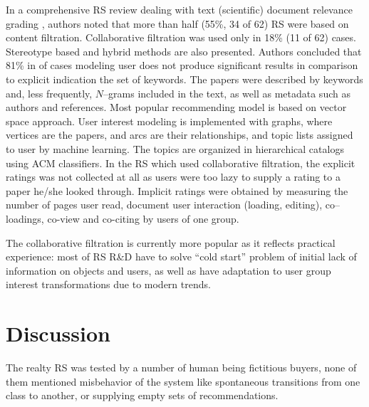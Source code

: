 \documentclass[conference,a4]{IEEEtran}
\begin{document}
In a comprehensive RS review dealing with text (scientific) document relevance grading \cite{br13}, authors noted that more than half (55\%, 34 of 62) RS were based on content filtration.  Collaborative filtration was used only in 18\% (11 of 62) cases.  Stereotype based and hybrid methods are also presented.  Authors concluded that 81\% in of cases modeling user does not produce significant results in comparison to explicit indication the set of keywords.  The papers were described by keywords and, less frequently, $N$--grams included in the text, as well as metadata such as authors and references.  Most popular recommending model is based on vector space approach.  User interest modeling is implemented with graphs, where vertices are the papers, and arcs are their relationships, and topic lists assigned to user by machine learning.  The topics are organized in hierarchical catalogs using ACM classifiers.  In the RS which used collaborative filtration, the explicit ratings was not collected at all as users were too lazy to supply a rating to a paper he/she looked through.  Implicit ratings were obtained by measuring the number of pages user read, document user interaction (loading, editing), co--loadings, co-view and co-citing by users of one group.

The collaborative filtration is currently more popular as it reflects practical experience: most of RS R\&D have to solve ``cold start'' problem of initial lack of information on objects and users, as well as have adaptation to user group interest transformations due to modern trends.



\section{Discussion}
\label{sec:disc}

The realty RS was tested by a number of human being fictitious buyers, none of them mentioned misbehavior of the system like spontaneous transitions from one class to another, or supplying empty sets of recommendations.
\end{document}

